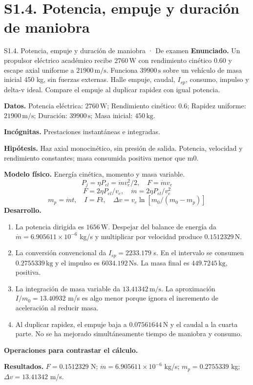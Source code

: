 \section{S1.4. Potencia, empuje y duración de maniobra}
\begin{studiumworked}{S1.4. Potencia, empuje y duración de maniobra · De examen}
\textbf{Enunciado.} Un propulsor eléctrico académico recibe $2760\,\mathrm{W}$ con rendimiento cinético 0.60 y escape axial uniforme a $21900\,\mathrm{m/s}$. Funciona $39900\,\mathrm{s}$ sobre un vehículo de masa inicial 450 kg, sin fuerzas externas. Halle empuje, caudal, $I_{sp}$, consumo, impulso y delta-v ideal. Compare el empuje al duplicar rapidez con igual potencia.

\textbf{Datos.} Potencia eléctrica: $2760\,\mathrm{W}$; Rendimiento cinético: $0.6$; Rapidez uniforme: $21900\,\mathrm{m/s}$; Duración: $39900\,\mathrm{s}$; Masa inicial: $450\,\mathrm{kg}$.

\textbf{Incógnitas.} Prestaciones instantáneas e integradas.

\textbf{Hipótesis.} Haz axial monocinético, sin presión de salida. Potencia, velocidad y rendimiento constantes; masa consumida positiva menor que m0.

\textbf{Modelo físico.} Energía cinética, momento y masa variable.
\[P_j=\eta P_{el}=\dot m v_e^2/2,\quad F=\dot m v_e\]
\[F=2\eta P_{el}/v_e,\quad \dot m=2\eta P_{el}/v_e^2\]
\[m_p=\dot mt,\quad I=Ft,\quad \Delta v=v_e\ln[m_0/(m_0-m_p)]\]
\textbf{Desarrollo.}
\begin{enumerate}
\item La potencia dirigida es $1656\,\mathrm{W}$. Despejar del balance de energía da $\dot m=6.905611\times10^{-6}$ kg/s y multiplicar por velocidad produce $0.1512329\,\mathrm{N}$.
\item La conversión convencional da $I_{sp}=2233.179$ s. En el intervalo se consumen $0.2755339\,\mathrm{kg}$ y el impulso es $6034.192\,\mathrm{N s}$. La masa final es $449.7245\,\mathrm{kg}$, positiva.
\item La integración de masa variable da $13.41342\,\mathrm{m/s}$. La aproximación $I/m_0=13.40932$ m/s es algo menor porque ignora el incremento de aceleración al reducir masa.
\item Al duplicar rapidez, el empuje baja a $0.07561644\,\mathrm{N}$ y el caudal a la cuarta parte. No se ha mejorado simultáneamente tiempo de maniobra y consumo.
\end{enumerate}
\textbf{Operaciones para contrastar el cálculo.}

\textbf{Resultados.} $F=0.1512329$ N; $\dot m=6.905611\times10^{-6}$ kg/s; $m_p=0.2755339$ kg; $\Delta v=13.41342$ m/s.


\end{studiumworked}
